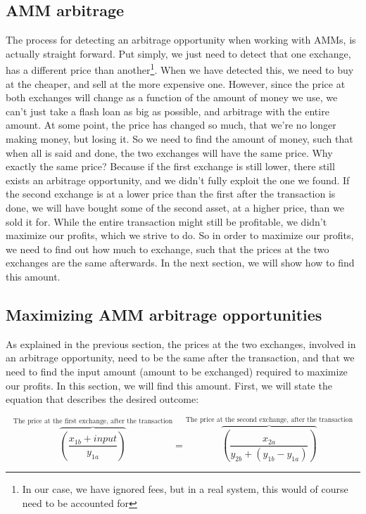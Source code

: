 \subsection{AMM arbitrage}
The process for detecting an arbitrage opportunity when working with AMMs, is
actually straight forward. Put simply, we just need to detect that one exchange,
has a different price than another\footnote{In our case, we have ignored fees,
but in a real system, this would of course need to be accounted for}. When we
have detected this, we need to buy at the cheaper, and sell at the more
expensive one. However, since the price at both exchanges will change as a
function of the amount of money we use, we can't just take a flash loan as big
as possible, and arbitrage with the entire amount. At some point, the price has
changed so much, that we're no longer making money, but losing it. So we need to
find the amount of money, such that when all is said and done, the two exchanges
will have the same price. Why exactly the same price? Because if the first
exchange is still lower, there still exists an arbitrage opportunity, and we
didn't fully exploit the one we found. If the second exchange is at a lower
price than the first after the transaction is done, we will have bought some of
the second asset, at a higher price, than we sold it for. While the entire
transaction might still be profitable, we didn't maximize our profits, which we
strive to do. So in order to maximize our profits, we need to find out how much
to exchange, such that the prices at the two exchanges are the same afterwards.
In the next section, we will show how to find this amount.

\subsection{Maximizing AMM arbitrage opportunities}\label{maximizing}
As explained in the previous section, the prices at the two exchanges, involved in
an arbitrage opportunity, need to be the same after the transaction, and that we
need to find the input amount (amount to be exchanged) required to maximize our
profits. In this section, we will find this amount. First, we will state the
equation that describes the desired outcome:

\begin{equation}
\overbrace{\left(\frac{x_{1b} + input}{y_{1a}}\right)}^{\text{The price at the
    first exchange, after the transaction}} = \overbrace{\left(\frac{x_{2a}}{y_{2b} + (y_{1b} - y_{1a})}\right)}^{\text{The price at the
    second exchange, after the transaction}}
\end{equation}

